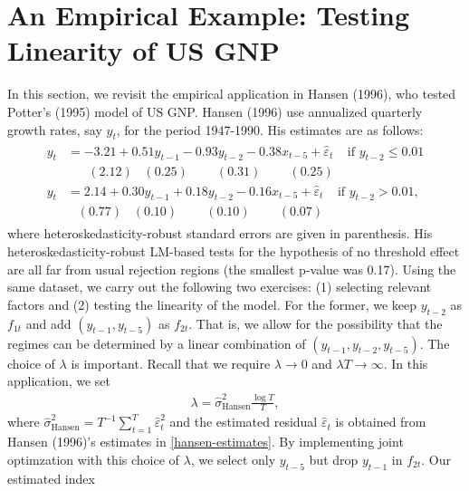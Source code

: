 \documentclass[12pt, reqno]{amsart}
\begin{document}
\onehalfspacing

\section*{An Empirical Example: Testing Linearity of US GNP}

In this section, we revisit the empirical application in Hansen (1996), who tested Potter's (1995) model of US GNP. 
Hansen (1996) use annualized quarterly growth rates, say $y_t$, for the period 1947-1990.
His estimates are as follows:
\begin{align}\label{hansen-estimates}
\begin{split}
y_t &=  - 3.21 + 0.51 y_{t-1} - 0.93 y_{t-2} - 0.38 x_{t-5} + \widehat{\varepsilon}_t    \;\;\;\; \text{if $y_{t-2} \leq 0.01$} \\
      &   \;\;\;\;\;\; (2.12) \;\;\; (0.25)   \;\;\;\;\;\;\;\; (0.31)   \;\;\;\;\;\;\;\; (0.25)     \\
y_t &=  2.14 + 0.30 y_{t-1} + 0.18 y_{t-2} - 0.16 x_{t-5} + \widehat{\varepsilon}_t    \;\;\;\; \text{if $y_{t-2} > 0.01$,}  \\
      &   \;\;\; (0.77) \;\;\; (0.10)   \;\;\;\;\;\;\;\; (0.10)   \;\;\;\;\;\;\;\; (0.07)    
\end{split}
\end{align}
where heteroskedasticity-robust standard errors are given in parenthesis. His heteroskedasticity-robust LM-based tests for the hypothesis of no threshold effect are all far from usual rejection regions (the smallest p-value was 0.17).
Using the same dataset, we carry out the following two exercises: (1) selecting relevant factors and (2) testing the linearity of the model.
For the former, we 
keep $y_{t-2}$ as $f_{1t}$ and add  $(y_{t-1}, y_{t-5})$ as $f_{2t}$. That is, we allow for the possibility that the regimes can be determined by a linear combination of $(y_{t-1}, y_{t-2}, y_{t-5})$. 
The choice of $\lambda$ is important. Recall that we require $\lambda \rightarrow 0$ and $\lambda T \rightarrow \infty$. In this application,
we set 
\begin{align*}
\lambda = \widehat{\sigma}_{\text{Hansen}}^2 \frac{\log T}{T},
\end{align*}
where $\widehat{\sigma}_{\text{Hansen}}^2 = T^{-1} \sum_{t=1}^T \widehat{\varepsilon}_t^2$ and the estimated residual $\widehat{\varepsilon}_t$
is obtained from Hansen (1996)'s estimates in \eqref{hansen-estimates}.
By implementing joint optimzation with this choice of $\lambda$, we select only $y_{t-5}$ but drop $y_{t-1}$ in $f_{2t}$. Our estimated index 
\end{document}
